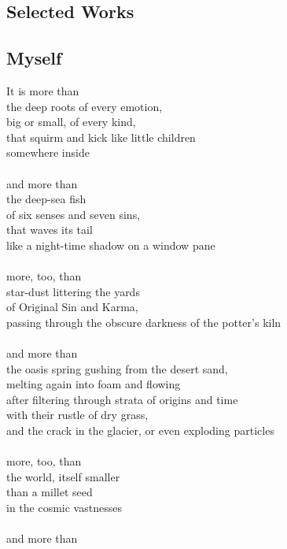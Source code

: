\documentclass[12pt,letterpaper]{article}
\begin{document}
\begin{appendix}
    \section{Selected Works}
    \begin{subappendices}
        \singlespacing
        \subsection{Myself}
        \begin{linenumbers*}
It is more than \\
the deep roots of every emotion, \\
big or small, of every kind, \\
that squirm and kick like little children \\
somewhere inside \\\\
and more than \\
the deep-sea fish \\
of six senses and seven sins, \\
that waves its tail \\
like a night-time shadow on a window pane \\\\
more, too, than \\
star-dust littering the yards \\
of Original Sin and Karma, \\
passing through the obscure darkness of the potter's kiln \\\\
and more than \\
the oasis spring gushing from the desert sand, \\
melting again into foam and flowing \\
after filtering through strata of origins and time \\
with their rustle of dry grass, \\
and the crack in the glacier, or even exploding particles \\\\
more, too, than \\
the world, itself smaller \\
than a millet seed \\
in the cosmic vastnesses \\\\
and more than \\

\end{linenumbers*}
\end{subappendices}
\end{appendix}
\end{document}

